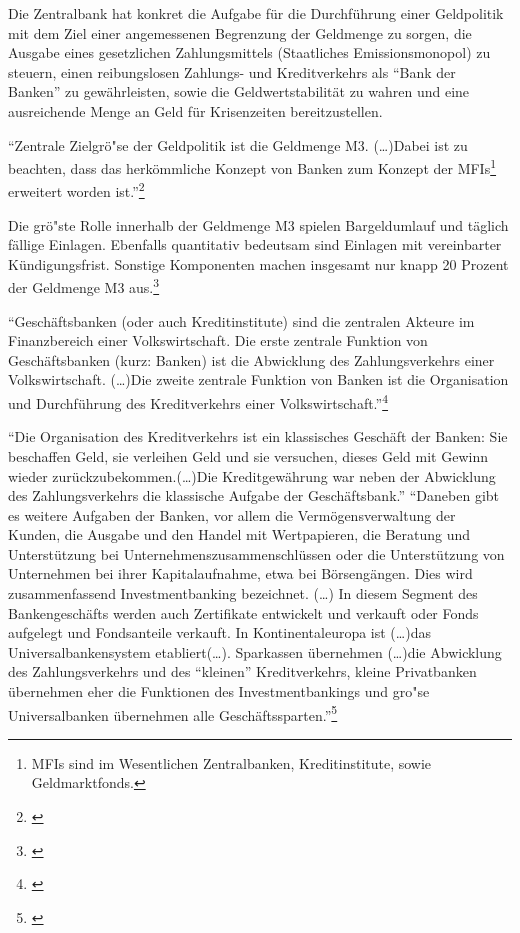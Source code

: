\documentclass[
        onecolumn,
        a4paper,
        abstracton,
        parskip=half
        ,final
        ]{scrartcl}
\begin{document}
Die Zentralbank hat konkret die Aufgabe für die Durchf{\"u}hrung einer Geldpolitik mit dem Ziel einer angemessenen Begrenzung der Geldmenge zu sorgen, die Ausgabe eines gesetzlichen Zahlungsmittels (Staatliches Emissionsmonopol) zu steuern, einen reibungslosen Zahlungs- und Kreditverkehrs als "`Bank der Banken"' zu gew{\"a}hrleisten, sowie die Geldwertstabilit{\"a}t zu wahren und eine ausreichende Menge an Geld f{\"u}r Krisenzeiten bereitzustellen.

"`Zentrale Zielgr{\"o}{"s}e der Geldpolitik ist die Geldmenge M3. (\ldots)Dabei ist zu beachten, dass das herk{\"o}mmliche Konzept von Banken zum Konzept der \ac{MFIs}\footnote[23]{MFIs sind im Wesentlichen Zentralbanken, Kreditinstitute, sowie Geldmarktfonds.\citep*[S.508]{Basseler2010}} erweitert worden ist."'\footnote[24]{\citep*[S. 507]{Basseler2010}}

Die gr{\"o}{"s}te Rolle innerhalb der Geldmenge M3 spielen Bargeldumlauf und t{\"a}glich f{\"a}llige Einlagen. Ebenfalls quantitativ bedeutsam sind Einlagen mit vereinbarter K{\"u}ndigungsfrist. Sonstige Komponenten machen insgesamt nur knapp 20 Prozent der Geldmenge M3 aus.\footnote[25]{\citep*[S.508]{Basseler2010}}

"`Gesch{\"a}ftsbanken (oder auch Kreditinstitute) sind die zentralen Akteure im Finanzbereich einer Volkswirtschaft. Die erste zentrale Funktion von Gesch{\"a}ftsbanken (kurz: Banken) ist die Abwicklung des Zahlungsverkehrs einer Volkswirtschaft. (\ldots)Die zweite zentrale Funktion von Banken ist die Organisation und Durchf{\"u}hrung des Kreditverkehrs einer Volkswirtschaft."'\footnote[26]{\citep*[vgl.][S.512-13]{Basseler2010}}

"`Die Organisation des Kreditverkehrs ist ein klassisches Gesch{\"a}ft der Banken: Sie beschaffen Geld, sie verleihen Geld und sie versuchen, dieses Geld mit Gewinn wieder zur{\"u}ckzubekommen.(\ldots)Die Kreditgew{\"a}hrung war neben der Abwicklung des Zahlungsverkehrs die klassische Aufgabe der Gesch{\"a}ftsbank."'
 "`Daneben gibt es weitere Aufgaben der Banken, vor allem die Verm{\"o}gensverwaltung der Kunden, die Ausgabe und den Handel mit Wertpapieren, die Beratung und Unterst{\"u}tzung bei Unternehmenszusammenschl{\"u}ssen oder die Unterst{\"u}tzung von Unternehmen bei ihrer Kapitalaufnahme, etwa bei B{\"o}rseng{\"a}ngen. Dies wird zusammenfassend Investmentbanking bezeichnet. (\ldots) In diesem Segment des Bankengesch{\"a}fts  werden auch Zertifikate entwickelt und verkauft oder Fonds aufgelegt und Fondsanteile verkauft. In Kontinentaleuropa ist (\ldots)das Universalbankensystem etabliert(\ldots). Sparkassen {\"u}bernehmen (\ldots)die Abwicklung des Zahlungsverkehrs und des "`kleinen"' Kreditverkehrs, kleine Privatbanken {\"u}bernehmen eher die Funktionen des Investmentbankings und gro{"s}e Universalbanken {\"u}bernehmen alle Gesch{\"a}ftssparten."'\footnote[27]{\citep*[vgl.][S.512-13]{Basseler2010}}
\end{document}
